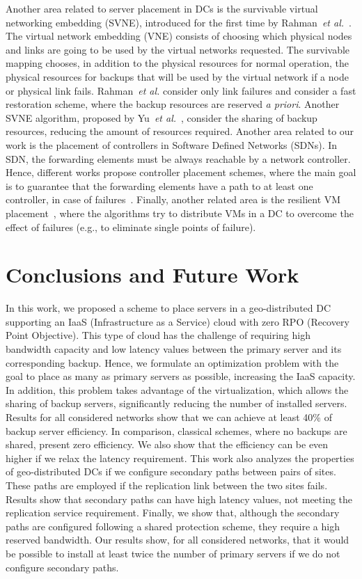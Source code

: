 \documentclass[preprint]{elsarticle}
\begin{document}
Another area related to server placement in DCs is the survivable virtual networking embedding (SVNE), introduced for the first time by Rahman~\textit{et al.}~\cite{rahman2010survivable}. The virtual network embedding (VNE) consists of choosing which physical nodes and links are going to be used by the virtual networks requested. The survivable mapping chooses, in addition to the physical resources for normal operation, the physical resources for backups that will be used by the virtual network if a node or physical link fails. 
Rahman~\textit{et al.} consider only link failures and consider a fast restoration scheme, where the backup resources are reserved \textit{a priori}. Another SVNE algorithm, proposed by Yu~\textit{et al.}~\cite{yu2011cost}, consider the sharing of backup resources, reducing the amount of resources required. Another area related to our work is the placement of controllers in Software Defined Networks (SDNs). In SDN, the forwarding elements must be always reachable by a network controller. Hence, different works propose controller placement schemes, where the main goal is to guarantee that the forwarding elements have a path to at least one controller, in case of failures~\cite{muller2014survivor}. Finally, another related area is the resilient VM placement~\cite{bodik2012surviving}, where the algorithms try to distribute VMs in a DC to overcome the effect of failures (e.g., to eliminate single points of failure).

\section{Conclusions and Future Work}
\label{zeroRPO:conc}

In this work, we proposed a scheme to place servers in a geo-distributed DC supporting an IaaS (Infrastructure as a Service) cloud with zero RPO (Recovery Point Objective). This type of cloud has the challenge of requiring high bandwidth capacity and low latency values between the primary server and its corresponding backup.
Hence, we formulate an optimization problem with the goal to place as many as primary servers as possible, increasing the IaaS capacity. In addition, this problem takes advantage of the virtualization, which allows the sharing of backup servers, significantly reducing the number of installed servers. Results for all considered networks show that we can achieve at least 40\% of backup server efficiency. In comparison, classical schemes, where no backups are shared, present zero efficiency.
We also show that the efficiency can be even higher if we relax the latency requirement. This work also analyzes the properties of geo-distributed DCs if we configure secondary paths between pairs of sites.
These paths are employed if the replication link between the two sites fails. Results show that secondary paths can have high latency values, not meeting the replication service requirement. Finally, we show that, although the secondary paths are configured following a shared protection scheme, they require a high reserved bandwidth. Our results show, for all considered networks, that it would be possible to install at least twice the number of primary servers if we do not configure secondary paths.
\end{document}
